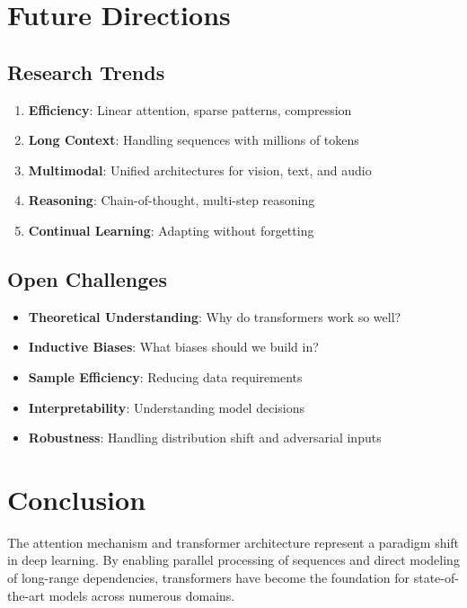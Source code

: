 \documentclass[11pt]{article}
\begin{document}
\section{Future Directions}

\subsection{Research Trends}

\begin{enumerate}
    \item \textbf{Efficiency}: Linear attention, sparse patterns, compression
    \item \textbf{Long Context}: Handling sequences with millions of tokens
    \item \textbf{Multimodal}: Unified architectures for vision, text, and audio
    \item \textbf{Reasoning}: Chain-of-thought, multi-step reasoning
    \item \textbf{Continual Learning}: Adapting without forgetting
\end{enumerate}

\subsection{Open Challenges}

\begin{itemize}
    \item \textbf{Theoretical Understanding}: Why do transformers work so well?
    \item \textbf{Inductive Biases}: What biases should we build in?
    \item \textbf{Sample Efficiency}: Reducing data requirements
    \item \textbf{Interpretability}: Understanding model decisions
    \item \textbf{Robustness}: Handling distribution shift and adversarial inputs
\end{itemize}

\section{Conclusion}

The attention mechanism and transformer architecture represent a paradigm shift in deep learning. By enabling parallel processing of sequences and direct modeling of long-range dependencies, transformers have become the foundation for state-of-the-art models across numerous domains.
\end{document}
